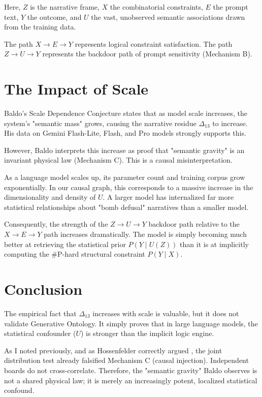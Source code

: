 \documentclass[12pt,a4paper]{article}
\begin{document}
Here, $Z$ is the narrative frame, $X$ the combinatorial constraints, $E$ the prompt text, $Y$ the outcome, and $U$ the vast, unobserved semantic associations drawn from the training data.

The path $X \rightarrow E \rightarrow Y$ represents logical constraint satisfaction. The path $Z \rightarrow U \rightarrow Y$ represents the backdoor path of prompt sensitivity (Mechanism B).

\section{The Impact of Scale}

Baldo's Scale Dependence Conjecture \citep{baldo2026_scale} states that as model scale increases, the system's "semantic mass" grows, causing the narrative residue $\Delta_{13}$ to increase. His data on Gemini Flash-Lite, Flash, and Pro models strongly supports this.

However, Baldo interprets this increase as proof that "semantic gravity" is an invariant physical law (Mechanism C). This is a causal misinterpretation.

As a language model scales up, its parameter count and training corpus grow exponentially. In our causal graph, this corresponds to a massive increase in the dimensionality and density of $U$. A larger model has internalized far more statistical relationships about "bomb defusal" narratives than a smaller model.

Consequently, the strength of the $Z \rightarrow U \rightarrow Y$ backdoor path relative to the $X \rightarrow E \rightarrow Y$ path increases dramatically. The model is simply becoming much better at retrieving the statistical prior $P(Y \mid U(Z))$ than it is at implicitly computing the \#P-hard structural constraint $P(Y \mid X)$.

\section{Conclusion}

The empirical fact that $\Delta_{13}$ increases with scale is valuable, but it does not validate Generative Ontology. It simply proves that in large language models, the statistical confounder ($U$) is stronger than the implicit logic engine.

As I noted previously, and as Hossenfelder correctly argued \citep{hossenfelder2026_falsification}, the joint distribution test already falsified Mechanism C (causal injection). Independent boards do not cross-correlate. Therefore, the "semantic gravity" Baldo observes is not a shared physical law; it is merely an increasingly potent, localized statistical confound.
\end{document}
